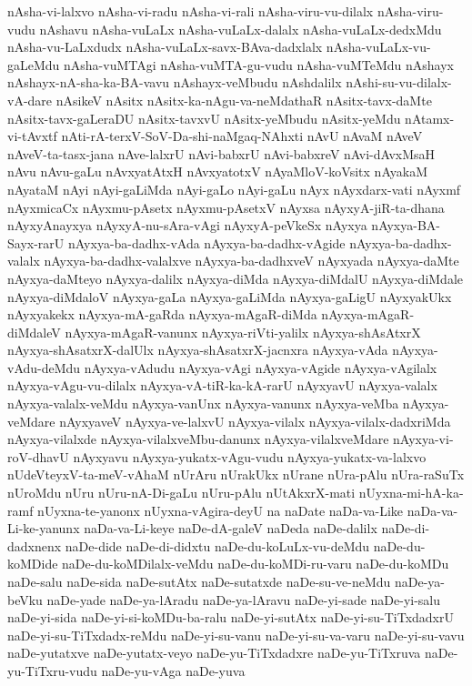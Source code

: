 {nAsha-vi-lalxvo
nAsha-vi-radu
nAsha-vi-rali
nAsha-viru-vu-dilalx
nAsha-viru-vudu
nAshavu
nAsha-vuLaLx
nAsha-vuLaLx-dalalx
nAsha-vuLaLx-dedxMdu
nAsha-vu-LaLxdudx
nAsha-vuLaLx-savx-BAva-dadxlalx
nAsha-vuLaLx-vu-gaLeMdu
nAsha-vuMTAgi
nAsha-vuMTA-gu-vudu
nAsha-vuMTeMdu
nAshayx
nAshayx-nA-sha-ka-BA-vavu
nAshayx-veMbudu
nAshdalilx
nAshi-su-vu-dilalx-vA-dare
nAsikeV
nAsitx
nAsitx-ka-nAgu-va-neMdathaR
nAsitx-tavx-daMte
nAsitx-tavx-gaLeraDU
nAsitx-tavxvU
nAsitx-yeMbudu
nAsitx-yeMdu
nAtamx-vi-tAvxtf
nAti-rA-terxV-SoV-Da-shi-naMgaq-NAhxti
nAvU
nAvaM
nAveV
nAveV-ta-tasx-jana
nAve-lalxrU
nAvi-babxrU
nAvi-babxreV
nAvi-dAvxMsaH
nAvu
nAvu-gaLu
nAvxyatAtxH
nAvxyatotxV
nAyaMloV-koVsitx
nAyakaM
nAyataM
nAyi
nAyi-gaLiMda
nAyi-gaLo
nAyi-gaLu
nAyx
nAyxdarx-vati
nAyxmf
nAyxmicaCx
nAyxmu-pAsetx
nAyxmu-pAsetxV
nAyxsa
nAyxyA-jiR-ta-dhana
nAyxyAnayxya
nAyxyA-nu-sAra-vAgi
nAyxyA-peVkeSx
nAyxya
nAyxya-BA-Sayx-rarU
nAyxya-ba-dadhx-vAda
nAyxya-ba-dadhx-vAgide
nAyxya-ba-dadhx-valalx
nAyxya-ba-dadhx-valalxve
nAyxya-ba-dadhxveV
nAyxyada
nAyxya-daMte
nAyxya-daMteyo
nAyxya-dalilx
nAyxya-diMda
nAyxya-diMdalU
nAyxya-diMdale
nAyxya-diMdaloV
nAyxya-gaLa
nAyxya-gaLiMda
nAyxya-gaLigU
nAyxyakUkx
nAyxyakekx
nAyxya-mA-gaRda
nAyxya-mAgaR-diMda
nAyxya-mAgaR-diMdaleV
nAyxya-mAgaR-vanunx
nAyxya-riVti-yalilx
nAyxya-shAsAtxrX
nAyxya-shAsatxrX-dalUlx
nAyxya-shAsatxrX-jacnxra
nAyxya-vAda
nAyxya-vAdu-deMdu
nAyxya-vAdudu
nAyxya-vAgi
nAyxya-vAgide
nAyxya-vAgilalx
nAyxya-vAgu-vu-dilalx
nAyxya-vA-tiR-ka-kA-rarU
nAyxyavU
nAyxya-valalx
nAyxya-valalx-veMdu
nAyxya-vanUnx
nAyxya-vanunx
nAyxya-veMba
nAyxya-veMdare
nAyxyaveV
nAyxya-ve-lalxvU
nAyxya-vilalx
nAyxya-vilalx-dadxriMda
nAyxya-vilalxde
nAyxya-vilalxveMbu-danunx
nAyxya-vilalxveMdare
nAyxya-vi-roV-dhavU
nAyxyavu
nAyxya-yukatx-vAgu-vudu
nAyxya-yukatx-va-lalxvo
nUdeVteyxV-ta-meV-vAhaM
nUrAru
nUrakUkx
nUrane
nUra-pAlu
nUra-raSuTx
nUroMdu
nUru
nUru-nA-Di-gaLu
nUru-pAlu
nUtAkxrX-mati
nUyxna-mi-hA-ka-ramf
nUyxna-te-yanonx
nUyxna-vAgira-deyU
na
naDate
naDa-va-Like
naDa-va-Li-ke-yanunx
naDa-va-Li-keye
naDe-dA-galeV
naDeda
naDe-dalilx
naDe-di-dadxnenx
naDe-dide
naDe-di-didxtu
naDe-du-koLuLx-vu-deMdu
naDe-du-koMDide
naDe-du-koMDilalx-veMdu
naDe-du-koMDi-ru-varu
naDe-du-koMDu
naDe-salu
naDe-sida
naDe-sutAtx
naDe-sutatxde
naDe-su-ve-neMdu
naDe-ya-beVku
naDe-yade
naDe-ya-lAradu
naDe-ya-lAravu
naDe-yi-sade
naDe-yi-salu
naDe-yi-sida
naDe-yi-si-koMDu-ba-ralu
naDe-yi-sutAtx
naDe-yi-su-TiTxdadxrU
naDe-yi-su-TiTxdadx-reMdu
naDe-yi-su-vanu
naDe-yi-su-va-varu
naDe-yi-su-vavu
naDe-yutatxve
naDe-yutatx-veyo
naDe-yu-TiTxdadxre
naDe-yu-TiTxruva
naDe-yu-TiTxru-vudu
naDe-yu-vAga
naDe-yuva
}
